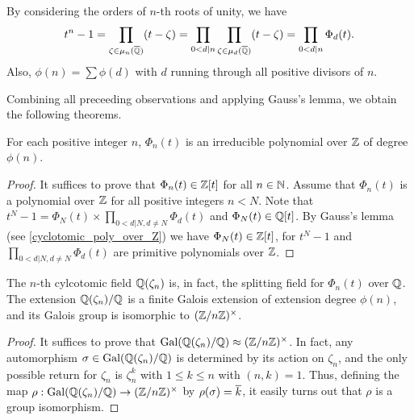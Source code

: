 \begin{obs}
    By considering the orders of $n$-th roots of unity, we have
    \begin{align*}
        t^n-1=\prod_{\zeta\in\mu_n(\overline{{\mathbb{Q}}})}(t-\zeta)=\prod_{0<d|n}\prod_{\zeta\in\mu_d(\overline{{\mathbb{Q}}})}(t-\zeta)=\prod_{0<d|n}\Phi_d(t).
    \end{align*}
    Also, $\phi(n)=\sum\phi(d)$ with $d$ running through all positive divisors of $n$.
\end{obs}
Combining all preceeding observations and applying Gauss's lemma, we obtain the following theorems.
\begin{thm}
    For each positive integer $n$, $\Phi_n(t)$ is an irreducible polynomial over ${\mathbb{Z}}$ of degree $\phi(n)$.
\end{thm}
\begin{proof}
    It suffices to prove that $\Phi_n(t)\in{\mathbb{Z}}[t]$ for all $n\in{\mathbb{N}}$.
    Assume that $\Phi_n(t)$ is a polynomial over ${\mathbb{Z}}$ for all positive integers $n<N$.
    Note that $t^N-1=\Phi_N(t)\times\prod_{0<d|N, d\neq N}\Phi_d(t)$ and $\Phi_N(t)\in{\mathbb{Q}}[t]$.
    By Gauss's lemma (see \cref{cyclotomic_poly_over_Z}) we have $\Phi_N(t)\in{\mathbb{Z}}[t]$, for $t^N-1$ and $\prod_{0<d|N, d\neq N}\Phi_d(t)$ are primitive polynomials over ${\mathbb{Z}}$.
\end{proof}
\begin{thm}
    The $n$-th cylcotomic field ${\mathbb{Q}}(\zeta_n)$ is, in fact, the splitting field for $\Phi_n(t)$ over ${\mathbb{Q}}$.
    The extension ${\mathbb{Q}}(\zeta_n)/{\mathbb{Q}}$ is a finite Galois extension of extension degree $\phi(n)$, and its Galois group is isomorphic to $({\mathbb{Z}}/n{\mathbb{Z}})^\times$.
\end{thm}
\begin{proof}
    It suffices to prove that ${\textrm{Gal}({{\mathbb{Q}}(\zeta_n)/{\mathbb{Q}}})}\approx({\mathbb{Z}}/n{\mathbb{Z}})^\times$.
    In fact, any automorphism $\sigma\in{\textrm{Gal}({{\mathbb{Q}}(\zeta_n)/{\mathbb{Q}}})}$ is determined by its action on $\zeta_n$, and the only possible return for $\zeta_n$ is $\zeta_n^k$ with $1\leq k\leq n$ with $(n, k)=1$.
    Thus, defining the map $\rho: {\textrm{Gal}({{\mathbb{Q}}(\zeta_n)/{\mathbb{Q}}})}\rightarrow({\mathbb{Z}}/n{\mathbb{Z}})^\times$ by $\rho(\sigma)=\overline{k}$, it easily turns out that $\rho$ is a group isomorphism.
\end{proof}

